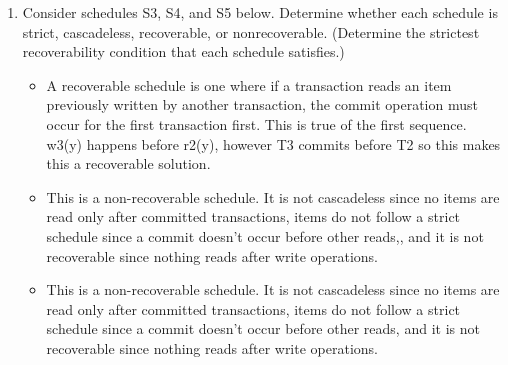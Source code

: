 \documentclass[12pt]{article}
\begin{document}
\begin{enumerate}
	\item  Consider schedules S3, S4, and S5 below. Determine whether each schedule is strict, cascadeless, recoverable, or nonrecoverable. (Determine the strictest recoverability condition that each schedule satisfies.)
	\begin{itemize}
		\item A recoverable schedule is one where if a transaction reads an item previously written by another transaction, the commit operation must occur for the first transaction first. This is true of the first sequence. w3(y) happens before r2(y), however T3 commits before T2 so this makes this a recoverable solution.
		\item This is a non-recoverable schedule. It is not cascadeless since no items are read only after committed transactions, items do not follow a strict schedule since a commit doesn't occur before other reads,, and it is not recoverable since nothing reads after write operations.
			\item This is a non-recoverable schedule. It is not cascadeless since no items are read only after committed transactions, items do not follow a strict schedule since a commit doesn't occur before other reads, and it is not recoverable since nothing reads after write operations.
	\end{itemize}

	

\end{enumerate}
\end{document}
